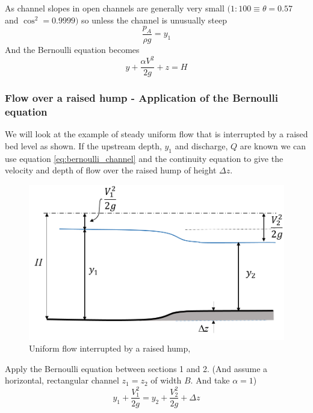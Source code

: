 \documentclass[a4paper, 12pt, british]{article} %
\numberwithin{equation}{section}
\numberwithin{figure}{section}
\numberwithin{table}{section}
\begin{document}
As channel slopes in open channels are generally very small $(1:100 \equiv \theta = 0.57$  and 
$\cos^2 = 0.9999)$ so unless the channel is unusually steep 
   \begin{equation}
 \frac{p_A}{\rho g}  = y_1 
 \end{equation}
And the Bernoulli equation becomes
  \begin{equation}
y  + \frac{ \alpha V^2}{2g} + z  = H
\label{eq:bernoulli_channel} %
\end{equation}


\subsubsection{Flow over a raised hump - Application of the Bernoulli equation}

We will look at the example of steady uniform flow that is interrupted by a raised bed level as shown. If the upstream depth, $y_1$ and discharge, $Q$ are known we can use equation \ref{eq:bernoulli_channel} and the continuity equation to give the velocity and depth of flow over the raised hump of height $\Delta z$.

  \begin{figure}[H]
 	\centering
 	\includegraphics[scale=0.6]{./images/hump_1_2018.png}
 	\caption{Uniform flow interrupted by a raised hump, \cite{chadwick}}
 	\label{fig:192}
 \end{figure} 

Apply the Bernoulli equation between sections 1 and 2. (And assume a horizontal, rectangular channel $z_1 = z_2$  of width $B$. And take $\alpha = 1$)
  \begin{equation}
y_1  + \frac{  V_1^2}{2g}   = y_2  + \frac{  V_2^2}{2g}  + \Delta z
\label{eq:bernoulli_hump1}
\end{equation}
\end{document}
